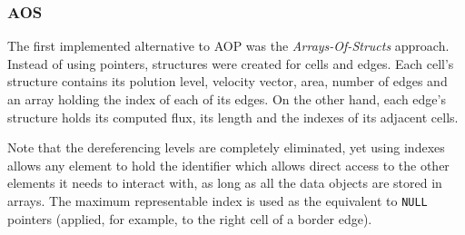 \subsubsection{AOS}

The first implemented alternative to AOP was the \textit{Arrays-Of-Structs} approach. Instead of using pointers, structures were created for cells and edges. Each cell's structure contains its polution level, velocity vector, area, number of edges and an array holding the index of each of its edges. On the other hand, each edge's structure holds its computed flux, its length and the indexes of its adjacent cells.

Note that the dereferencing levels are completely eliminated, yet using indexes allows any element to hold the identifier which allows direct access to the other elements it needs to interact with, as long as all the data objects are stored in arrays. The maximum representable index is used as the equivalent to \texttt{NULL} pointers (applied, for example, to the right cell of a border edge).